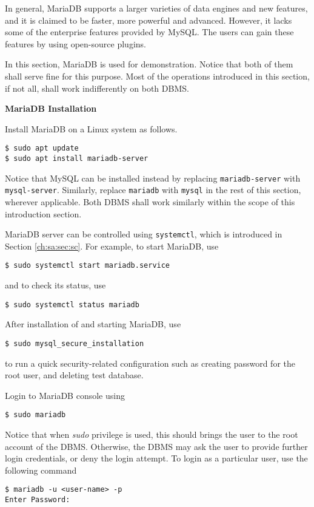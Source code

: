 In general, MariaDB supports a larger varieties of data engines and new features, and it is claimed to be faster, more powerful and advanced. However, it lacks some of the enterprise features provided by MySQL. The users can gain these features by using open-source plugins.

In this section, MariaDB is used for demonstration. Notice that both of them shall serve fine for this purpose. Most of the operations introduced in this section, if not all, shall work indifferently on both DBMS.

\vspace{0.1in}
\noindent \textbf{MariaDB Installation}
\vspace{0.1in}

Install MariaDB on a Linux system as follows.
\begin{lstlisting}
$ sudo apt update
$ sudo apt install mariadb-server
\end{lstlisting}
Notice that MySQL can be installed instead by replacing \verb|mariadb-server| with \verb|mysql-server|. Similarly, replace \verb|mariadb| with \verb|mysql| in the rest of this section, wherever applicable. Both DBMS shall work similarly within the scope of this introduction section.

MariaDB server can be controlled using \verb|systemctl|, which is introduced in Section \ref{ch:sa:sec:sc}. For example, to start MariaDB, use
\begin{lstlisting}
$ sudo systemctl start mariadb.service
\end{lstlisting}
and to check its status, use
\begin{lstlisting}
$ sudo systemctl status mariadb
\end{lstlisting}

After installation of and starting MariaDB, use
\begin{lstlisting}
$ sudo mysql_secure_installation
\end{lstlisting}
to run a quick security-related configuration such as creating password for the root user, and deleting test database.

Login to MariaDB console using
\begin{lstlisting}
$ sudo mariadb
\end{lstlisting}
Notice that when \textit{sudo} privilege is used, this should brings the user to the root account of the DBMS. Otherwise, the DBMS may ask the user to provide further login credentials, or deny the login attempt. To login as a particular user, use the following command
\begin{lstlisting}
$ mariadb -u <user-name> -p
Enter Password:
\end{lstlisting}

